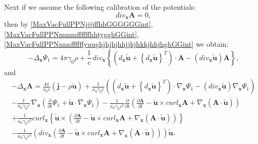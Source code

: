 \documentclass{article}
\theoremstyle{definition}
\theoremstyle{remark}
\renewcommand{\vec}[1]{\mathbf{#1}}
\newcommand{\er}{\eqref}
\newcommand{\er}{\eqref}
\begin{document}
Next if we assume the following calibration of the potentials:
\begin{equation}\label{MaxVacFullPPNjjjjffhhGGGGGGint}
div_{\vec x}\vec A=0,
\end{equation}
then by \er{MaxVacFullPPNjjjjffhhGGGGGGint},
\er{MaxVacFullPPNmmmffffffhhtygghGGint},
\er{MaxVacFullPPNnnnffffffyuughjhjhjhhjjkjhkkjhhjhghGGint}
we obtain:
\begin{equation}\label{MaxVacFullPPNmmmffffffhhtygghGGGGint}
-\Delta_{\vec x}\Psi_1=4\pi\gamma_0\rho+\frac{1}{c}\,div_{\vec x}
\left\{\left(d_{\vec x}\vec {\tilde u}+\left\{d_{\vec x}\vec {\tilde
u}\right\}^T\right)\cdot\vec A-\left(div_{\vec x}\vec {\tilde
u}\right)\vec A\right\},
\end{equation}
and
\begin{multline}\label{MaxVacFullPPNnnnffffffyuughjhjhjhhjjkjhkkjhhjhghGGGGint}
-\Delta_{\vec x}\vec A= \frac{4\pi}{\kappa_0 c}\left(\vec j-\rho\vec
{\tilde u}\right)+\frac{1}{\kappa_0\gamma_0 c}\left(\left(d_{\vec
x}\vec {\tilde u}+\left\{d_{\vec x}\vec {\tilde
u}\right\}^T\right)\cdot \nabla_{\vec x}\Psi_1-\left(div_{\vec
x}\vec {\tilde u}\right)\nabla_{\vec
x}\Psi_1\right)\\-\frac{1}{\kappa_0\gamma_0 c}\,\nabla_{\vec
x}\left(\frac{\partial}{\partial t}\Psi_1+\vec {\tilde
u}\cdot\nabla_{\vec x}\Psi_1\right)-\frac{1}{\kappa_0\gamma_0
c^2}\frac{\partial}{\partial t}\left(\frac{\partial\vec A}{\partial
t}-\vec {\tilde u}\times curl_{\vec x}\vec A+\nabla_{\vec
x}\left(\vec A\cdot\vec {\tilde
u}\right)\right)\\+\frac{1}{\kappa_0\gamma_0 c^2}curl_{\vec x}
\left\{\vec {\tilde u}\times
\left(\frac{\partial\vec A}{\partial t}-\vec {\tilde u}\times
curl_{\vec x}\vec A+\nabla_{\vec x}\left(\vec A\cdot\vec {\tilde
u}\right)\right)\right\}\\-\frac{1}{\kappa_0\gamma_0
c^2}\left(div_{\vec x}\left(\frac{\partial\vec A}{\partial t}-\vec
{\tilde u}\times curl_{\vec x}\vec A+\nabla_{\vec x}\left(\vec
A\cdot\vec {\tilde u}\right)\right)\right)\vec {\tilde u}.
%
%
%

\end{multline}
\end{document}
